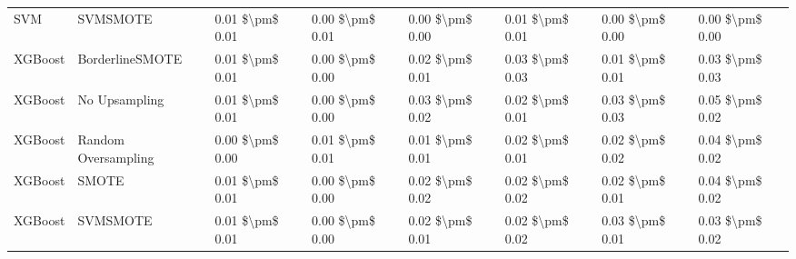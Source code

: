 \begin{tabular}{llllllll}
                            SVM &                      SVMSMOTE & 0.01 \$\textbackslash pm\$ 0.01 &           0.00 \$\textbackslash pm\$ 0.01 &       0.00 \$\textbackslash pm\$ 0.00 &        0.01 \$\textbackslash pm\$ 0.01 &                         0.00 \$\textbackslash pm\$ 0.00 &     0.00 \$\textbackslash pm\$ 0.00 \\
                        XGBoost &               BorderlineSMOTE & 0.01 \$\textbackslash pm\$ 0.01 &           0.00 \$\textbackslash pm\$ 0.00 &       0.02 \$\textbackslash pm\$ 0.01 &        0.03 \$\textbackslash pm\$ 0.03 &                         0.01 \$\textbackslash pm\$ 0.01 &     0.03 \$\textbackslash pm\$ 0.03 \\
                        XGBoost &                 No Upsampling & 0.01 \$\textbackslash pm\$ 0.01 &           0.00 \$\textbackslash pm\$ 0.00 &       0.03 \$\textbackslash pm\$ 0.02 &        0.02 \$\textbackslash pm\$ 0.01 &                         0.03 \$\textbackslash pm\$ 0.03 &     0.05 \$\textbackslash pm\$ 0.02 \\
                        XGBoost &           Random Oversampling & 0.00 \$\textbackslash pm\$ 0.00 &           0.01 \$\textbackslash pm\$ 0.01 &       0.01 \$\textbackslash pm\$ 0.01 &        0.02 \$\textbackslash pm\$ 0.01 &                         0.02 \$\textbackslash pm\$ 0.02 &     0.04 \$\textbackslash pm\$ 0.02 \\
                        XGBoost &                         SMOTE & 0.01 \$\textbackslash pm\$ 0.01 &           0.00 \$\textbackslash pm\$ 0.00 &       0.02 \$\textbackslash pm\$ 0.02 &        0.02 \$\textbackslash pm\$ 0.02 &                         0.02 \$\textbackslash pm\$ 0.01 &     0.04 \$\textbackslash pm\$ 0.02 \\
                        XGBoost &                      SVMSMOTE & 0.01 \$\textbackslash pm\$ 0.01 &           0.00 \$\textbackslash pm\$ 0.00 &       0.02 \$\textbackslash pm\$ 0.01 &        0.02 \$\textbackslash pm\$ 0.02 &                         0.03 \$\textbackslash pm\$ 0.01 &     0.03 \$\textbackslash pm\$ 0.02 \\
\bottomrule
\end{tabular}
